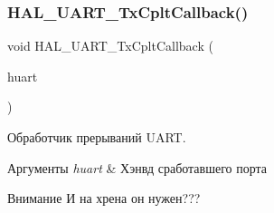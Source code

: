 \subsubsection{\texorpdfstring{H\+A\+L\+\_\+\+U\+A\+R\+T\+\_\+\+Tx\+Cplt\+Callback()}{HAL\_UART\_TxCpltCallback()}}
{\footnotesize\ttfamily void H\+A\+L\+\_\+\+U\+A\+R\+T\+\_\+\+Tx\+Cplt\+Callback (\begin{DoxyParamCaption}\item[{U\+A\+R\+T\+\_\+\+Handle\+Type\+Def $\ast$}]{huart }\end{DoxyParamCaption})}



Обработчик прерываний U\+A\+RT. 


\begin{DoxyParams}{Аргументы}
{\em huart} & Хэнвд сработавшего порта \\
\hline
\end{DoxyParams}
\begin{DoxyAttention}{Внимание}
И на хрена он нужен??? 
\end{DoxyAttention}
